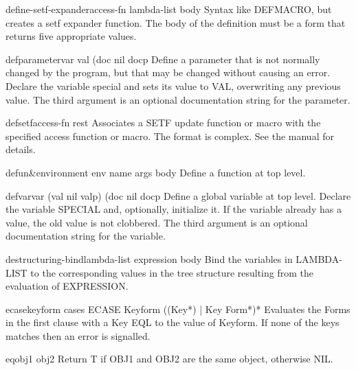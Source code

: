 \begin{macro}{define-setf-expander}{access-fn lambda-list \body body}{}
  Syntax like DEFMACRO, but creates a setf expander function. The body
  of the definition must be a form that returns five appropriate values.
\end{macro}

\begin{macro}{defparameter}{var val \op (doc nil docp}{}
  Define a parameter that is not normally changed by the program,
  but that may be changed without causing an error. Declare the
  variable special and sets its value to VAL, overwriting any
  previous value. The third argument is an optional documentation
  string for the parameter.
\end{macro}

\begin{macro}{defsetf}{access-fn \rest rest}{}
  Associates a SETF update function or macro with the specified access
  function or macro. The format is complex. See the manual for details.
\end{macro}

\begin{macro}{defun}{&environment env name args \body body}{}
  Define a function at top level.
\end{macro}

\begin{macro}{defvar}{var \op (val nil valp) (doc nil docp}{}
  Define a global variable at top level. Declare the variable
  SPECIAL and, optionally, initialize it. If the variable already has a
  value, the old value is not clobbered. The third argument is an optional
  documentation string for the variable.
\end{macro}

\begin{macro}{destructuring-bind}{lambda-list expression \body body}{}
  Bind the variables in LAMBDA-LIST to the corresponding values in the
tree structure resulting from the evaluation of EXPRESSION.
\end{macro}

\begin{macro}{ecase}{keyform \body cases}{}
  ECASE Keyform {({(Key*) | Key} Form*)}*
  Evaluates the Forms in the first clause with a Key EQL to the value of
  Keyform. If none of the keys matches then an error is signalled.
\end{macro}

\begin{function}{eq}{obj1 obj2}{}
  Return T if OBJ1 and OBJ2 are the same object, otherwise NIL.
\end{function}


